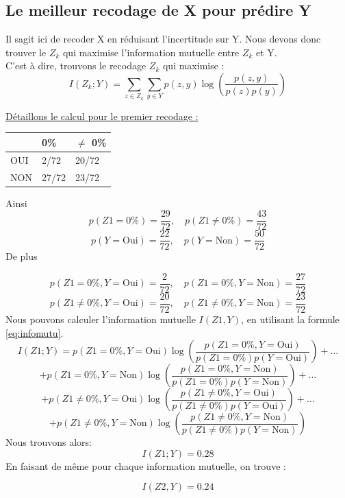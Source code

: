 \documentclass{article}
\begin{document}
\subsection{Le meilleur recodage de X pour prédire Y }

Il sagit ici de recoder X en réduisant l'incertitude sur Y.
Nous devons donc trouver le $Z_k$ qui maximise l'information mutuelle entre $Z_k$ et Y.
\\
C'est à dire, trouvons le recodage $Z_k$ qui maximise :
\begin{equation}
  I(Z_k; Y) = \sum_{z\in Z_k} \sum_{y \in Y} p(z, y) \log \left( \frac{p(z, y)}{p(z)p(y)} \right)
  \label{eq:infomutu}
\end{equation}

\underline{Détaillons le calcul pour le premier recodage :}

\begin{table}[H]
  \centering
  \begin{tabular}{|l|l|l|}
  \hline
      & 0\%   & $\neq$ 0\% \\ \hline
  OUI & 2/72  & 20/72 \\ \hline
  NON & 27/72 & 23/72 \\ \hline
  \end{tabular}
  \end{table}
Ainsi
\[
p(Z1 = 0\%) = \frac{29}{72}, \quad p(Z1 \neq 0\%) = \frac{43}{72}
\]
\[
p(Y = \text{Oui}) = \frac{22}{72}, \quad p(Y = \text{Non}) = \frac{50}{72}
\]
De plus

\[
p(Z1 = 0\%, Y = \text{Oui}) = \frac{2}{72}, \quad p(Z1 = 0\%, Y = \text{Non}) = \frac{27}{72}
\]
\[
p(Z1 \neq 0\%, Y = \text{Oui}) = \frac{20}{72}, \quad p(Z1 \neq 0\%, Y = \text{Non}) = \frac{23}{72}
\]
Nous pouvons calculer l'information mutuelle $I(Z1,Y)$, en utilisant la formule \ref{eq:infomutu}.
\[
I(Z1; Y) = p(Z1 = 0\%, Y = \text{Oui}) \log \left(\frac{p(Z1 = 0\%, Y = \text{Oui})}{p(Z1 = 0\%) p(Y = \text{Oui})}\right) + \ldots
\]
\[
+ p(Z1 = 0\%, Y = \text{Non}) \log \left(\frac{p(Z1 = 0\%, Y = \text{Non})}{p(Z1 = 0\%) p(Y = \text{Non})}\right) + \ldots
\]
\[
+ p(Z1 \neq 0\%, Y = \text{Oui}) \log \left(\frac{p(Z1 \neq 0\%, Y = \text{Oui})}{p(Z1 \neq 0\%) p(Y = \text{Oui})}\right) + \ldots
\]
\[
+ p(Z1 \neq 0\%, Y = \text{Non}) \log \left(\frac{p(Z1 \neq 0\%, Y = \text{Non})}{p(Z1 \neq 0\%) p(Y = \text{Non})}\right)
\]
Nous trouvons alors:
\[
  I(Z1; Y)= 0.28
\]
En faisant de même pour chaque information mutuelle, on trouve : 

\[
I(Z2,Y) = 0.24
\]
\end{document}
